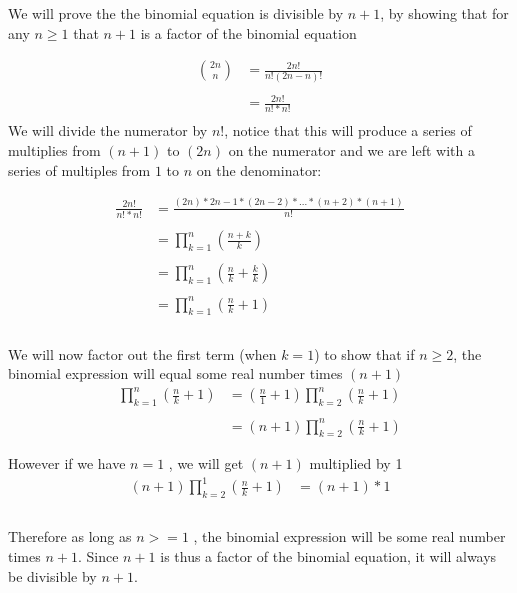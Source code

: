 \documentclass[11pt]{article}
\begin{document}
We will prove the the binomial equation is divisible by $n+1$, by showing that for any $n\geq1$ that $n+1$ is a factor of the binomial equation

\begin{align*}
\binom{2n}{n} & = \frac{2n!}{n!(2n-n)!}\\\\
&= \frac{2n!}{n!*n!}\\
\end{align*}
We will divide the numerator by $n!$, notice that this will produce a series of multiplies from $(n+1)$ to $(2n)$ on the numerator and we are left with a series of multiples from $1$ to $n$ on the denominator:

\begin{align*}
\frac{2n!}{n!*n!} &= \frac{(2n)*2n-1*(2n-2)*...*(n+2)*(n+1)}{n!}\\\\
&= \prod_{k=1}^{n}(\frac{n+k}{k})\\\\
&= \prod_{k=1}^{n}(\frac{n}{k}+\frac{k}{k})\\\\
&= \prod_{k=1}^{n}(\frac{n}{k}+1)\\\\
\end{align*}

We will now factor out the first term (when $k = 1$) to show that if $n\geq 2$, the binomial expression will equal some real number times $(n+1)$ 
\begin{align*}
\prod_{k=1}^{n}(\frac{n}{k}+1) & = (\frac{n}{1} + 1) \prod_{k=2}^{n}(\frac{n}{k}+1)\\\\
&=  (n + 1) \prod_{k=2}^{n}(\frac{n}{k}+1)
\end{align*}

However if we have $n = 1$ , we will get $(n+1)$ multiplied by 1
\begin{align*}
(n + 1) \prod_{k=2}^{1}(\frac{n}{k}+1) & = (n+1)* 1\\\\
\end{align*}

Therefore as long as $ n >= 1 $ , the binomial expression will be some real number times $n+1$. Since $n+1$ is thus a factor of the binomial equation, it will always be divisible by $n+1$.
\end{document}
